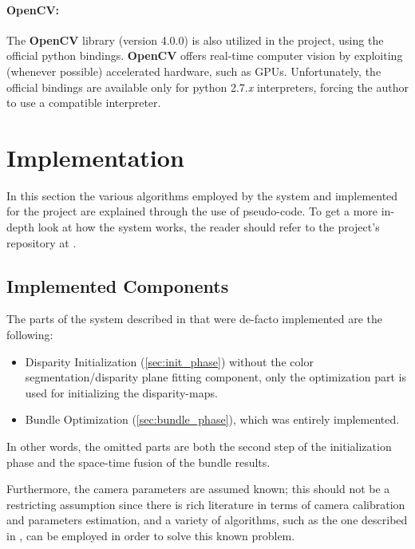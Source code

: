 \paragraph{OpenCV:}
The \textbf{OpenCV} library (version 4.0.0) is also utilized in the project, using the official python bindings.
\textbf{OpenCV} offers real-time computer vision by exploiting (whenever possible) accelerated hardware, such as GPUs.
Unfortunately, the official bindings are available only for python 2.7.\textit{x} interpreters, forcing the author to use a compatible interpreter.


\section{Implementation}
In this section the various algorithms employed by the system and  implemented for the project are explained through the use of pseudo-code. To get a more in-depth look at how the system works, the reader should refer to the project's \Github{} repository at \ProjectUrl.

\subsection{Implemented Components}\label{sec:implemented components}
The parts of the system described in \cite{Zhang2009} that were de-facto implemented are the following:
\begin{itemize}
	\item Disparity Initialization (\cref{sec:init_phase}) without the color segmentation/disparity plane fitting component, \ie{} only the \LBP{} optimization part is used for initializing the disparity-maps.
	\item Bundle Optimization (\cref{sec:bundle_phase}), which was entirely implemented.
\end{itemize}
In other words, the omitted parts are both the second step of the initialization phase and the space-time fusion of the bundle results.

Furthermore, the camera parameters are assumed known; this should not be a restricting assumption since there is rich literature in terms of camera calibration and parameters estimation, and a variety of algorithms, such as the one described in \cite{Zhang2007}, can be employed in order to solve this known problem.

